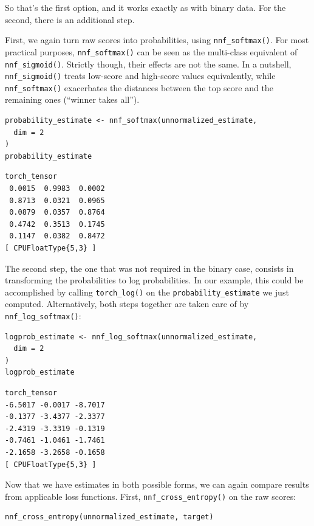 \documentclass[
  letterpaper,
]{krantz}
\begin{document}
So that's the first option, and it works exactly as with binary data.
For the second, there is an additional step.

First, we again turn raw scores into probabilities, using
\texttt{nnf\_softmax()}. For most practical purposes,
\texttt{nnf\_softmax()} can be seen as the multi-class equivalent of
\texttt{nnf\_sigmoid()}. Strictly though, their effects are not the
same. In a nutshell, \texttt{nnf\_sigmoid()} treats low-score and
high-score values equivalently, while \texttt{nnf\_softmax()}
exacerbates the distances between the top score and the remaining ones
(``winner takes all'').

\begin{verbatim}
probability_estimate <- nnf_softmax(unnormalized_estimate,
  dim = 2
)
probability_estimate
\end{verbatim}

\begin{verbatim}
torch_tensor
 0.0015  0.9983  0.0002
 0.8713  0.0321  0.0965
 0.0879  0.0357  0.8764
 0.4742  0.3513  0.1745
 0.1147  0.0382  0.8472
[ CPUFloatType{5,3} ]
\end{verbatim}

The second step, the one that was not required in the binary case,
consists in transforming the probabilities to log probabilities. In our
example, this could be accomplished by calling \texttt{torch\_log()} on
the \texttt{probability\_estimate} we just computed. Alternatively, both
steps together are taken care of by \texttt{nnf\_log\_softmax()}:

\begin{verbatim}
logprob_estimate <- nnf_log_softmax(unnormalized_estimate,
  dim = 2
)
logprob_estimate
\end{verbatim}

\begin{verbatim}
torch_tensor
-6.5017 -0.0017 -8.7017
-0.1377 -3.4377 -2.3377
-2.4319 -3.3319 -0.1319
-0.7461 -1.0461 -1.7461
-2.1658 -3.2658 -0.1658
[ CPUFloatType{5,3} ]
\end{verbatim}

Now that we have estimates in both possible forms, we can again compare
results from applicable loss functions. First,
\texttt{nnf\_cross\_entropy()} on the raw
scores:

\begin{verbatim}
nnf_cross_entropy(unnormalized_estimate, target)
\end{verbatim}
\end{document}
